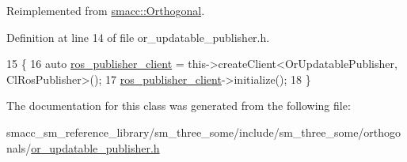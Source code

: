 Reimplemented from \hyperlink{classsmacc_1_1Orthogonal_a7a3da420b1554e20aea3ed01067df05c}{smacc\+::\+Orthogonal}.



Definition at line 14 of file or\+\_\+updatable\+\_\+publisher.\+h.


\begin{DoxyCode}
15     \{
16         \textcolor{keyword}{auto} \hyperlink{namespaceros__publisher__client}{ros\_publisher\_client} = this->createClient<OrUpdatablePublisher,
       ClRosPublisher>();
17         \hyperlink{namespaceros__publisher__client}{ros\_publisher\_client}->initialize();
18     \}
\end{DoxyCode}


The documentation for this class was generated from the following file\+:\begin{DoxyCompactItemize}
\item 
smacc\+\_\+sm\+\_\+reference\+\_\+library/sm\+\_\+three\+\_\+some/include/sm\+\_\+three\+\_\+some/orthogonals/\hyperlink{sm__three__some_2include_2sm__three__some_2orthogonals_2or__updatable__publisher_8h}{or\+\_\+updatable\+\_\+publisher.\+h}\end{DoxyCompactItemize}
